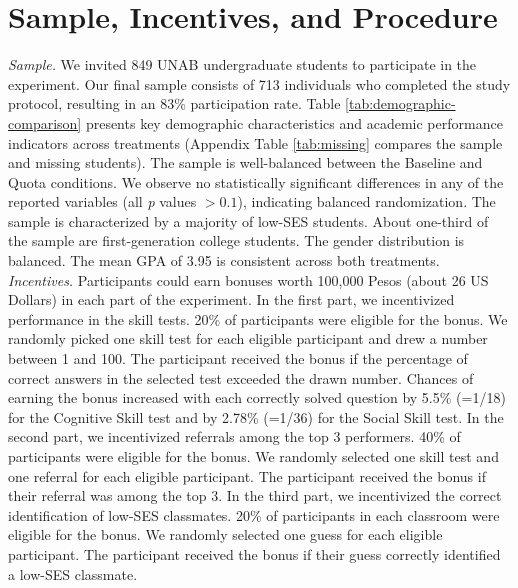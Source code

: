 \documentclass[11pt,a4paper,oneside]{article}
\begin{document}
\section{Sample, Incentives, and Procedure}
\textit{Sample.} We invited 849 UNAB undergraduate students to participate in the experiment. Our final sample consists of 713 individuals who completed the study protocol, resulting in an 83\% participation rate. Table \ref{tab:demographic-comparison} presents key demographic characteristics and academic performance indicators across treatments (Appendix Table \ref{tab:missing} compares the sample and missing students). The sample is well-balanced between the Baseline and Quota conditions. We observe no statistically significant differences in any of the reported variables (all \textit{p} values $> 0.1$), indicating balanced randomization. The sample is characterized by a majority of low-SES students. About one-third of the sample are first-generation college students. The gender distribution is balanced. The mean GPA of 3.95 is consistent across both treatments. \medskip\\ 
\textit{Incentives.} 
Participants could earn bonuses worth 100,000 Pesos (about 26 US Dollars) in each part of the experiment. In the first part, we incentivized performance in the skill tests. 20\% of participants were eligible for the bonus. We randomly picked one skill test for each eligible participant and drew a number between 1 and 100. The participant received the bonus if the percentage of correct answers in the selected test exceeded the drawn number. Chances of earning the bonus increased with each correctly solved question by 5.5\% (=1/18) for the Cognitive Skill test and by 2.78\% (=1/36) for the Social Skill test. In the second part, we incentivized referrals among the top 3 performers. 40\% of participants were eligible for the bonus. We randomly selected one skill test and one referral for each eligible participant. The participant received the bonus if their referral was among the top 3. In the third part, we incentivized the correct identification of low-SES classmates. 20\% of participants in each classroom were eligible for the bonus. We randomly selected one guess for each eligible participant. The participant received the bonus if their guess correctly identified a low-SES classmate.\medskip\\
\end{document}
